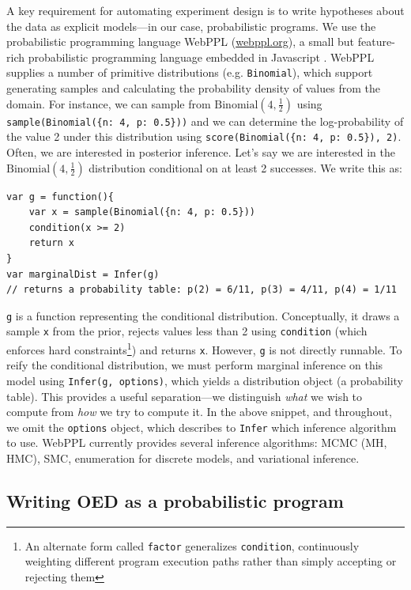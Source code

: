 \documentclass{article}
\begin{document}
A key requirement for automating experiment design is to write hypotheses about the data as explicit models---in our case, probabilistic programs.
We use the probabilistic programming language WebPPL (\url{webppl.org}), a small but feature-rich probabilistic programming language embedded in Javascript \cite{dippl}.
WebPPL supplies a number of primitive distributions (e.g. \lstinline{Binomial}), which support generating samples and calculating the probability density of values from the domain.
For instance, we can sample from $\text{Binomial}(4, \frac{1}{2})$ using \lstinline|sample(Binomial({n: 4, p: 0.5}))| and we can determine the log-probability of the value 2 under this distribution using \lstinline|score(Binomial({n: 4, p: 0.5}), 2)|.
Often, we are interested in posterior inference. Let's say we are interested in the $\text{Binomial}(4, \frac{1}{2})$ distribution conditional on at least 2 successes. We write this as:
\begin{lstlisting}[mathescape, label={code:webppl}]
var g = function(){
	var x = sample(Binomial({n: 4, p: 0.5}))
	condition(x >= 2)
	return x
}
var marginalDist = Infer(g)
// returns a probability table: p(2) = 6/11, p(3) = 4/11, p(4) = 1/11
\end{lstlisting}
\lstinline{g} is a function representing the conditional distribution.
Conceptually, it draws a sample \lstinline{x} from the prior, rejects values less than 2 using \lstinline{condition} (which enforces hard constraints\footnote{ An alternate form called \lstinline{factor} generalizes \lstinline{condition}, continuously weighting different program execution paths rather than simply accepting or rejecting them}) and returns \lstinline{x}.
However, \lstinline{g} is not directly runnable.
To reify the conditional distribution, we must perform marginal inference on this model using \lstinline{Infer(g, options)}, which yields a distribution object (a probability table).
This provides a useful separation---we distinguish \emph{what} we wish to compute from \emph{how} we try to compute it.
In the above snippet, and throughout, we omit the \lstinline{options} object, which describes to \lstinline{Infer} which inference algorithm to use. WebPPL currently provides several inference algorithms: MCMC (MH, HMC), SMC, enumeration for discrete models, and variational inference.

\subsection{Writing OED as a probabilistic program}
\end{document}
